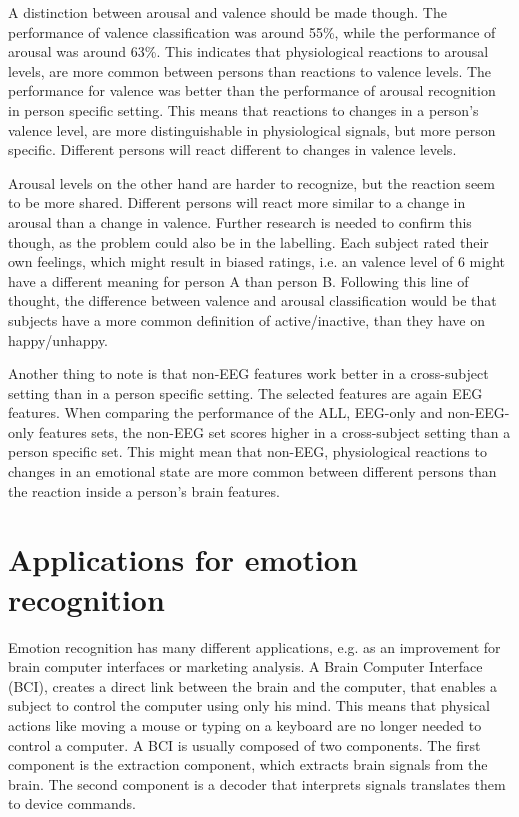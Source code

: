 \npar 

A distinction between arousal and valence should be made though. The performance of valence classification was around 55\%, while the performance of arousal was around 63\%. This indicates that physiological reactions to arousal levels, are more common between persons than reactions to valence levels. The performance for valence was better than the performance of arousal recognition in person specific setting. This means that reactions to changes in a person's valence level, are more distinguishable in physiological signals, but more person specific. Different persons will react different to changes in valence levels.

\npar

Arousal levels on the other hand are harder to recognize, but the reaction seem to be more shared. Different persons will react more similar to a change in arousal than a change in valence. Further research is needed to confirm this though, as the problem could also be in the labelling. Each subject rated their own feelings, which might result in biased ratings, i.e. an valence level of 6 might have a different meaning for person A than person B. Following this line of thought, the difference between valence and arousal classification would be that subjects have a more common definition of active/inactive, than they have on happy/unhappy.

\npar

Another thing to note is that non-EEG features work better in a cross-subject setting than in a person specific setting. The selected features are again EEG features. When comparing the performance of the ALL, EEG-only and non-EEG-only features sets, the non-EEG set scores higher in a cross-subject setting than a person specific set. This might mean that non-EEG, physiological reactions to changes in an emotional state are more common between different persons than the reaction inside a person's brain features.

\section{Applications for emotion recognition}

Emotion recognition has many different applications, e.g. as an improvement for brain computer interfaces or marketing analysis. A Brain Computer Interface (BCI), creates a direct link between the brain and the computer\cite{LangModel}, that enables a subject to control the computer using only his mind. This means that physical actions like moving a mouse or typing on a keyboard are no longer needed to control a computer. A BCI is usually composed of two components. The first component is the extraction component, which extracts brain signals from the brain. The second component is a decoder that interprets signals translates them to device commands.

